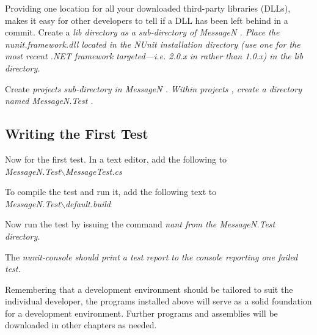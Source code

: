 Providing one location for all your downloaded third-party libraries (DLLs), makes it easy for other developers to tell if a DLL has been left behind in a commit. Create a \em lib \em directory as a sub-directory of \em MessageN \em. Place the \em nunit.framework.dll \em located in the NUnit installation directory (use one for the most recent .NET framework targeted---i.e. 2.0.x in rather than 1.0.x) in the \em lib \em directory.

Create \em projects \em sub-directory in \em MessageN \em. Within \em projects \em, create a directory named \em MessageN.Test \em.

\subsection{Writing the First Test}

Now for the first test. In a text editor, add the following to \\
\em MessageN.Test$\backslash$MessageTest.cs \em

 

To compile the test and run it, add the following text to \\
\em MessageN.Test$\backslash$default.build \em



Now run the test by issuing the command \em nant \em from the \em MessageN.Test \em directory.

The \em nunit-console \em should print a test report to the console reporting one failed test.

Remembering that a development environment should be tailored to suit the individual developer, the programs installed above will serve as a solid foundation for a development environment. Further programs and assemblies will be downloaded in other chapters as needed.